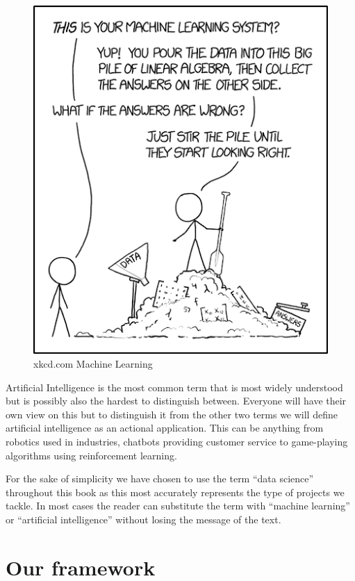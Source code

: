\documentclass[
]{book}
\begin{document}
\begin{figure}
\includegraphics[width=0.5\linewidth]{figures/xkcd} \caption{xkcd.com Machine Learning}\label{fig:xkcd-fig}
\end{figure}

Artificial Intelligence is the most common term that is most widely understood but is possibly also the hardest to distinguish between. Everyone will have their own view on this but to distinguish it from the other two terms we will define artificial intelligence as an actional application. This can be anything from robotics used in industries, chatbots providing customer service to game-playing algorithms using reinforcement learning.

For the sake of simplicity we have chosen to use the term ``data science'' throughout this book as this most accurately represents the type of projects we tackle. In most cases the reader can substitute the term with ``machine learning'' or ``artificial intelligence'' without losing the message of the text.

\hypertarget{our-framework}{%
\section{Our framework}\label{our-framework}}
\end{document}
